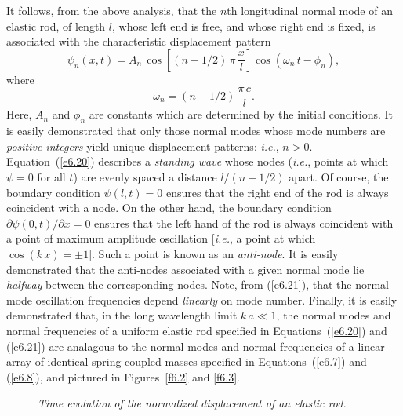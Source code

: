 It follows, from the above analysis, that the $n$th longitudinal normal mode of an elastic rod, of length $l$, whose left end is free, and whose
right end is fixed, is
associated with the characteristic displacement pattern 
\begin{equation}\label{e6.20}
\psi_n(x,t) = A_n\,\cos\left[(n-1/2)\,\pi\,\frac{x}{l}\right]\cos(\omega_n\,t-\phi_n),
\end{equation}
where
\begin{equation}\label{e6.21}
\omega_n = (n-1/2)\,\frac{\pi\,c}{l}.
\end{equation}
Here, $A_n$ and $\phi_n$ are constants which are determined by the initial conditions. 
It is easily demonstrated that only those  normal modes whose  mode numbers  are {\em positive integers}\/ yield unique displacement patterns: {\em i.e.}, $n>0$.
Equation~(\ref{e6.20}) describes a {\em standing wave}\/ whose nodes ({\em i.e.}, points at which $\psi=0$ for all $t$) are evenly spaced
a distance $l/(n-1/2)$ apart. Of course, the boundary condition $\psi(l,t)=0$ ensures that the right end of the rod is always coincident with a node.
On the other hand, the boundary condition $\partial\psi(0,t)/\partial x=0$
ensures that the left hand of the rod is always coincident with a point of
maximum amplitude oscillation [{\em i.e.}, a point at which $\cos(k\,x)=\pm 1$].
Such a point is known as an {\em anti-node}. It is easily demonstrated that
the anti-nodes associated with a given normal mode lie {\em halfway}\/ between the corresponding nodes. 
 Note, from (\ref{e6.21}), that the normal mode oscillation frequencies depend {\em linearly}\/ on
mode number. Finally, it is easily demonstrated that, in the long wavelength limit $k\,a\ll 1$, the normal modes and normal frequencies of a uniform elastic
rod specified in Equations~(\ref{e6.20}) and (\ref{e6.21}) are analagous
to the normal modes and normal frequencies of a linear array of identical spring coupled masses specified in Equations~(\ref{e6.7}) and (\ref{e6.8}), and  pictured in
Figures~\ref{f6.2} and \ref{f6.3}. 

\begin{figure}
\epsfysize=7in
\centerline{}
\caption{\em Time evolution of the normalized displacement of an elastic rod.}\label{f6.4}   
\end{figure}

